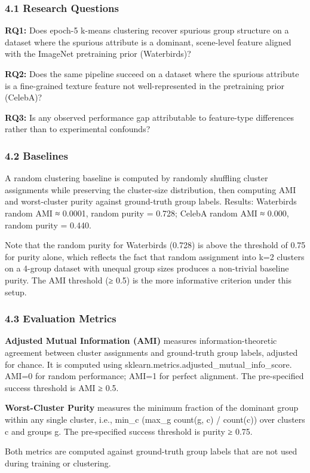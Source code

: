 
\subsubsection{4.1 Research Questions}

\textbf{RQ1:} Does epoch-5 k-means clustering recover spurious group structure on a dataset where the spurious attribute is a dominant, scene-level feature aligned with the ImageNet pretraining prior (Waterbirds)?

\textbf{RQ2:} Does the same pipeline succeed on a dataset where the spurious attribute is a fine-grained texture feature not well-represented in the pretraining prior (CelebA)?

\textbf{RQ3:} Is any observed performance gap attributable to feature-type differences rather than to experimental confounds?

\subsubsection{4.2 Baselines}

A random clustering baseline is computed by randomly shuffling cluster assignments while preserving the cluster-size distribution, then computing AMI and worst-cluster purity against ground-truth group labels. Results: Waterbirds random AMI ≈ 0.0001, random purity = 0.728; CelebA random AMI ≈ 0.000, random purity = 0.440.

Note that the random purity for Waterbirds (0.728) is above the threshold of 0.75 for purity alone, which reflects the fact that random assignment into k=2 clusters on a 4-group dataset with unequal group sizes produces a non-trivial baseline purity. The AMI threshold (≥ 0.5) is the more informative criterion under this setup.

\subsubsection{4.3 Evaluation Metrics}

\textbf{Adjusted Mutual Information (AMI)} measures information-theoretic agreement between cluster assignments and ground-truth group labels, adjusted for chance. It is computed using sklearn.metrics.adjusted_mutual_info_score. AMI=0 for random performance; AMI=1 for perfect alignment. The pre-specified success threshold is AMI ≥ 0.5.

\textbf{Worst-Cluster Purity} measures the minimum fraction of the dominant group within any single cluster, i.e., min_c (max_g count(g, c) / count(c)) over clusters c and groups g. The pre-specified success threshold is purity ≥ 0.75.

Both metrics are computed against ground-truth group labels that are not used during training or clustering.

